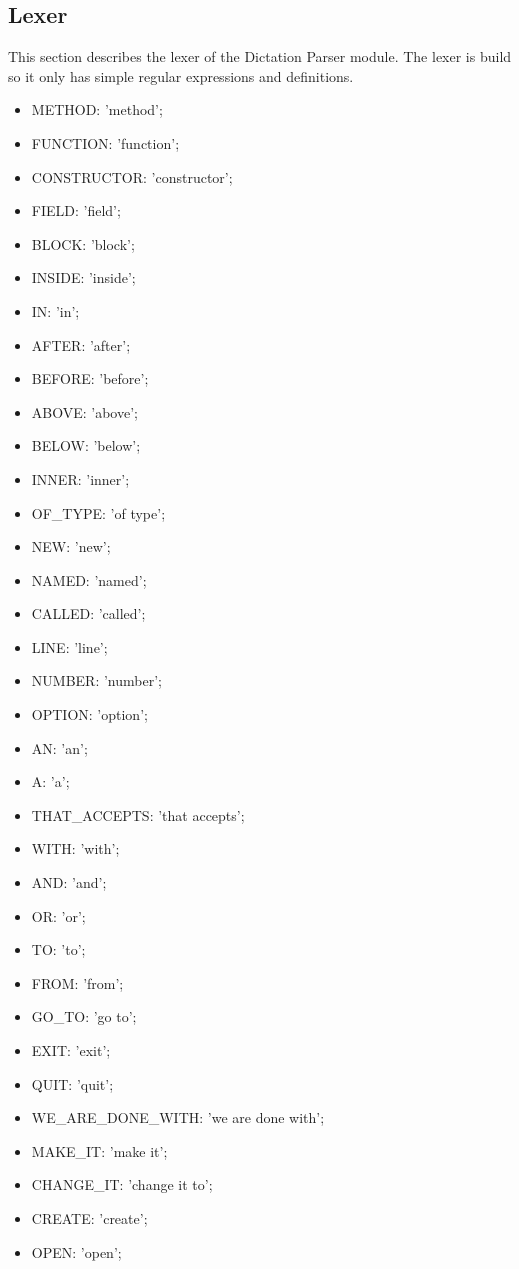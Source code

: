 \subsection{Lexer}
This section describes the lexer of the Dictation Parser module. The lexer is build so it only has simple regular expressions and definitions.
\begin{itemize}
	\item METHOD: 'method';
	\item FUNCTION: 'function';
	\item CONSTRUCTOR: 'constructor';
	\item FIELD: 'field';
	\item BLOCK: 'block';
	\item INSIDE: 'inside';
	\item IN: 'in';
	\item AFTER: 'after';
	\item BEFORE: 'before';
	\item ABOVE: 'above';
	\item BELOW: 'below';
	\item INNER: 'inner';
	\item OF\_TYPE: 'of type';
	\item NEW: 'new';
	\item NAMED: 'named';
	\item CALLED: 'called';
	\item LINE: 'line';
	\item NUMBER: 'number';
	\item OPTION: 'option';
	\item AN: 'an';
	\item A: 'a';
	\item THAT\_ACCEPTS: 'that accepts';
	\item WITH: 'with';
	\item AND: 'and';
	\item OR: 'or';
	\item TO: 'to';
	\item FROM: 'from';
	\item GO\_TO: 'go to';
	\item EXIT: 'exit';
	\item QUIT: 'quit';
	\item WE\_ARE\_DONE\_WITH: 'we are done with';
	\item MAKE\_IT: 'make it';
	\item CHANGE\_IT: 'change it to';
	\item CREATE: 'create';
	\item OPEN: 'open';

\end{itemize}
